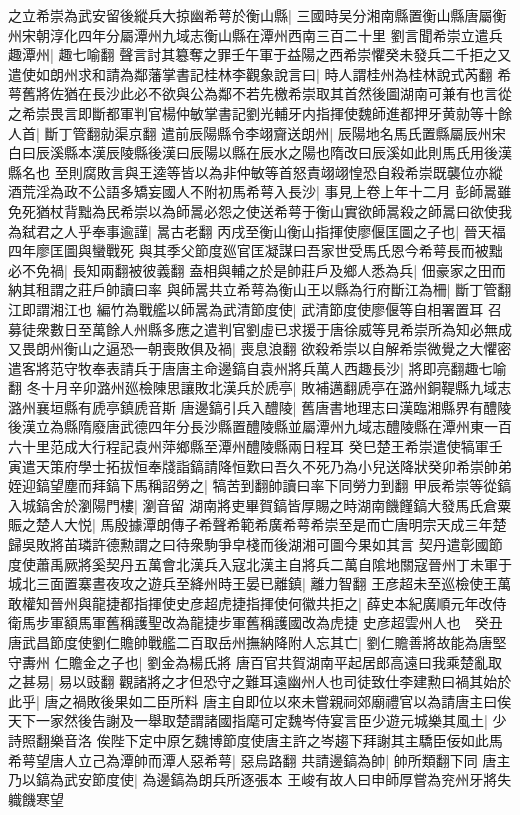 之立希崇為武安留後縱兵大掠幽希萼於衡山縣|{
	三國時吴分湘南縣置衡山縣唐屬衡州宋朝淳化四年分屬潭州九域志衡山縣在潭州西南三百二十里}
劉言聞希崇立遣兵趣潭州|{
	趣七喻翻}
聲言討其簒奪之罪壬午軍于益陽之西希崇懼癸未發兵二千拒之又遣使如朗州求和請為鄰藩掌書記桂林李觀象說言曰|{
	時人謂桂州為桂林說式芮翻}
希萼舊將佐猶在長沙此必不欲與公為鄰不若先檄希崇取其首然後圖湖南可兼有也言從之希崇畏言即斷都軍判官楊仲敏掌書記劉光輔牙内指揮使魏師進都押牙黄勍等十餘人首|{
	斷丁管翻勍渠京翻}
遣前辰陽縣令李翊齎送朗州|{
	辰陽地名馬氏置縣屬辰州宋白曰辰溪縣本漢辰陵縣後漢曰辰陽以縣在辰水之陽也隋改曰辰溪如此則馬氏用後漢縣名也}
至則腐敗言與王逵等皆以為非仲敏等首怒責翊翊惶恐自殺希崇既襲位亦縱酒荒淫為政不公語多矯妄國人不附初馬希萼入長沙|{
	事見上卷上年十二月}
彭師暠雖免死猶杖背黜為民希崇以為師暠必怨之使送希萼于衡山實欲師暠殺之師暠曰欲使我為弑君之人乎奉事逾謹|{
	暠古老翻}
丙戌至衡山衡山指揮使廖偃匡圖之子也|{
	晉天福四年廖匡圖與蠻戰死}
與其季父節度廵官匡凝謀曰吾家世受馬氏恩今希萼長而被黜必不免禍|{
	長知兩翻被彼義翻}
盍相與輔之於是帥莊戶及鄉人悉為兵|{
	佃豪家之田而納其租謂之莊戶帥讀曰率}
與師暠共立希萼為衡山王以縣為行府斷江為柵|{
	斷丁管翻江即謂湘江也}
編竹為戰艦以師暠為武清節度使|{
	武清節度使廖偃等自相署置耳}
召募徒衆數日至萬餘人州縣多應之遣判官劉虛已求援于唐徐威等見希崇所為知必無成又畏朗州衡山之逼恐一朝喪敗俱及禍|{
	喪息浪翻}
欲殺希崇以自解希崇微覺之大懼密遣客將范守牧奉表請兵于唐唐主命邊鎬自袁州將兵萬人西趣長沙|{
	將即亮翻趣七喻翻}
冬十月辛卯潞州廵檢陳思讓敗北漢兵於虒亭|{
	敗補邁翻虒亭在潞州銅鞮縣九域志潞州襄垣縣有虒亭鎮虒音斯}
唐邊鎬引兵入醴陵|{
	舊唐書地理志曰漢臨湘縣界有醴陵後漢立為縣隋廢唐武德四年分長沙縣置醴陵縣並屬潭州九域志醴陵縣在潭州東一百六十里范成大行程記袁州萍鄉縣至潭州醴陵縣兩日程耳}
癸巳楚王希崇遣使犒軍壬寅遣天策府學士拓拔恒奉牋詣鎬請降恒歎曰吾久不死乃為小兒送降狀癸卯希崇帥弟姪迎鎬望塵而拜鎬下馬稱詔勞之|{
	犒苦到翻帥讀曰率下同勞力到翻}
甲辰希崇等從鎬入城鎬舍於瀏陽門樓|{
	瀏音留}
湖南將吏畢賀鎬皆厚賜之時湖南饑饉鎬大發馬氏倉粟賑之楚人大悦|{
	馬殷據潭朗傳子希聲希範希廣希萼希崇至是而亡唐明宗天成三年楚歸吳敗將苖璘許德勲謂之曰待衆駒爭皁棧而後湖湘可圖今果如其言}
契丹遣彰國節度使蕭禹厥將奚契丹五萬會北漢兵入寇北漢主自將兵二萬自隂地關寇晉州丁未軍于城北三面置寨晝夜攻之遊兵至絳州時王晏已離鎮|{
	離力智翻}
王彦超未至巡檢使王萬敢權知晉州與龍捷都指揮使史彦超虎捷指揮使何徽共拒之|{
	薛史本紀廣順元年改侍衛馬步軍額馬軍舊稱護聖改為龍捷步軍舊稱護國改為虎捷}
史彦超雲州人也　癸丑唐武昌節度使劉仁贍帥戰艦二百取岳州撫納降附人忘其亡|{
	劉仁贍善將故能為唐堅守夀州}
仁贍金之子也|{
	劉金為楊氏將}
唐百官共賀湖南平起居郎高遠曰我乘楚亂取之甚易|{
	易以豉翻}
觀諸將之才但恐守之難耳遠幽州人也司徒致仕李建勲曰禍其始於此乎|{
	唐之禍敗後果如二臣所料}
唐主自即位以來未嘗親祠郊廟禮官以為請唐主曰俟天下一家然後告謝及一舉取楚謂諸國指麾可定魏岑侍宴言臣少遊元城樂其風土|{
	少詩照翻樂音洛}
俟陛下定中原乞魏博節度使唐主許之岑趨下拜謝其主驕臣佞如此馬希萼望唐人立己為潭帥而潭人惡希萼|{
	惡烏路翻}
共請邊鎬為帥|{
	帥所類翻下同}
唐主乃以鎬為武安節度使|{
	為邊鎬為朗兵所逐張本}
王峻有故人曰申師厚嘗為兖州牙將失軄饑寒望

